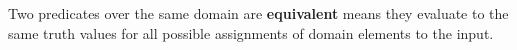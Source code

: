 Two predicates over the same domain are {\bf equivalent} means they evaluate to
the same truth values for all possible assignments of domain elements to the
input.